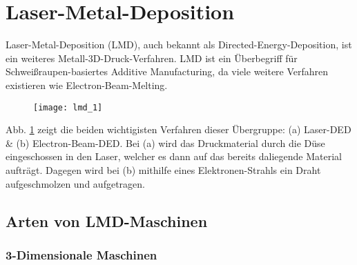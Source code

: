 \documentclass[main.tex]{subfiles}
\begin{document}
\section{Laser-Metal-Deposition}
Laser-Metal-Deposition (LMD), auch bekannt als Directed-Energy-Deposition, ist ein weiteres Metall-3D-Druck-Verfahren. LMD ist ein Überbegriff für Schweißraupen-basiertes Additive Manufacturing, da viele weitere Verfahren existieren wie Electron-Beam-Melting.
\begin{figure}[h!]
	\begin{center}

		\texttt{[image: lmd\_1]}
\label{img:lmd_1}	
	\end{center}
\end{figure}
Abb. \ref{img:lmd_1} zeigt die beiden wichtigisten Verfahren dieser Übergruppe: (a) Laser-DED \& (b) Electron-Beam-DED.
Bei (a) wird das Druckmaterial durch die Düse eingeschossen in den Laser, welcher es dann auf das bereits daliegende Material aufträgt. 
Dagegen wird bei (b) mithilfe eines Elektronen-Strahls ein Draht aufgeschmolzen und aufgetragen. \parencite{ALL3D_1}

\subsection{Arten von LMD-Maschinen}
\subsubsection{3-Dimensionale Maschinen}
\end{document}
